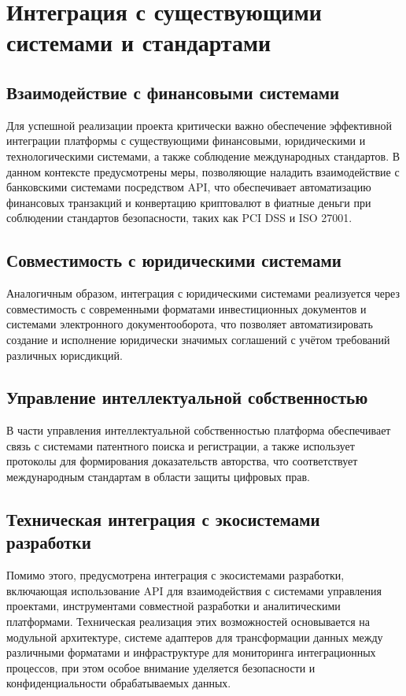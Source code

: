 \documentclass[
    candidate, %
    subf, %
    dotsinheaders=false,
]{disser}
\begin{document}
\section{Интеграция с существующими системами и стандартами}

\subsection{Взаимодействие с финансовыми системами}
Для успешной реализации проекта критически важно обеспечение эффективной интеграции платформы с существующими финансовыми, юридическими и технологическими системами, а также соблюдение международных стандартов. В данном контексте предусмотрены меры, позволяющие наладить взаимодействие с банковскими системами посредством API, что обеспечивает автоматизацию финансовых транзакций и конвертацию криптовалют в фиатные деньги при соблюдении стандартов безопасности, таких как PCI DSS и ISO 27001.

\subsection{Совместимость с юридическими системами}
Аналогичным образом, интеграция с юридическими системами реализуется через совместимость с современными форматами инвестиционных документов и системами электронного документооборота, что позволяет автоматизировать создание и исполнение юридически значимых соглашений с учётом требований различных юрисдикций.

\subsection{Управление интеллектуальной собственностью}
В части управления интеллектуальной собственностью платформа обеспечивает связь с системами патентного поиска и регистрации, а также использует протоколы для формирования доказательств авторства, что соответствует международным стандартам в области защиты цифровых прав.

\subsection{Техническая интеграция с экосистемами разработки}
Помимо этого, предусмотрена интеграция с экосистемами разработки, включающая использование API для взаимодействия с системами управления проектами, инструментами совместной разработки и аналитическими платформами. Техническая реализация этих возможностей основывается на модульной архитектуре, системе адаптеров для трансформации данных между различными форматами и инфраструктуре для мониторинга интеграционных процессов, при этом особое внимание уделяется безопасности и конфиденциальности обрабатываемых данных.
\end{document}
